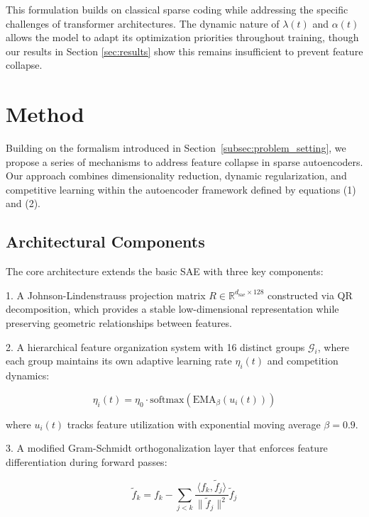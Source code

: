 \documentclass{article} %
\begin{document}
This formulation builds on classical sparse coding while addressing the specific challenges of transformer architectures. The dynamic nature of $\lambda(t)$ and $\alpha(t)$ allows the model to adapt its optimization priorities throughout training, though our results in Section \ref{sec:results} show this remains insufficient to prevent feature collapse.

\section{Method}
\label{sec:method}

Building on the formalism introduced in Section~\ref{subsec:problem_setting}, we propose a series of mechanisms to address feature collapse in sparse autoencoders. Our approach combines dimensionality reduction, dynamic regularization, and competitive learning within the autoencoder framework defined by equations (1) and (2).

\subsection{Architectural Components}

The core architecture extends the basic SAE with three key components:

1. A Johnson-Lindenstrauss projection matrix $R \in \mathbb{R}^{d_{\text{sae}} \times 128}$ constructed via QR decomposition, which provides a stable low-dimensional representation while preserving geometric relationships between features.

2. A hierarchical feature organization system with 16 distinct groups $\mathcal{G}_i$, where each group maintains its own adaptive learning rate $\eta_i(t)$ and competition dynamics:

\begin{equation}
\eta_i(t) = \eta_0 \cdot \text{softmax}(\text{EMA}_{\beta}(u_i(t)))
\end{equation}

where $u_i(t)$ tracks feature utilization with exponential moving average $\beta=0.9$.

3. A modified Gram-Schmidt orthogonalization layer that enforces feature differentiation during forward passes:

\begin{equation}
\tilde{f}_k = f_k - \sum_{j<k} \frac{\langle f_k, \tilde{f}_j \rangle}{\|\tilde{f}_j\|^2} \tilde{f}_j
\end{equation}
\end{document}
